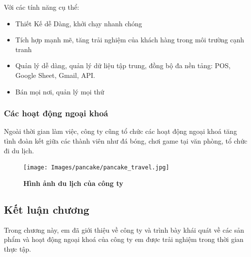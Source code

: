 Với các tính năng cụ thể: 
\begin{itemize}
  \item Thiết Kế dễ Dàng, khởi chạy nhanh chóng
  \item Tích hợp mạnh mẽ, tăng trải nghiệm của khách hàng trong môi trường cạnh tranh
  \item Quản lý dễ dàng, quản lý dữ liệu tập trung, đồng bộ đa nền tảng: POS, Google Sheet, Gmail, API.
  \item Bán mọi nơi, quản lý mọi thứ
\end{itemize}

\subsubsection{Các hoạt động ngoại khoá}
Ngoài thời gian làm việc, công ty cũng tổ chức các hoạt động ngoại khoá tăng tình đoàn kết giữa các thành viên
như đá bóng, chơi game tại văn phòng, tổ chức đi du lịch.
\begin{figure}[H]
  \centering
  \texttt{[image: Images/pancake/pancake\_travel.jpg]}
  \caption[Hình ảnh du lịch của công ty]{\bfseries \fontsize{12pt}{0pt}
  \selectfont Hình ảnh du lịch của công ty}
  \label{ttlk} %
\end{figure}


\subsection{Kết luận chương}
Trong chương này, em đã giới thiệu về công ty và trình bày khái quát về các sản phẩm và hoạt động ngoại khoá của công ty
em được trải nghiệm trong thời gian thực tập.

\newpage
